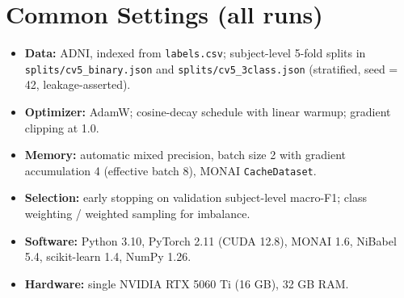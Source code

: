 \section*{Common Settings (all runs)}
\begin{itemize}
    \item \textbf{Data:} ADNI, indexed from \texttt{labels.csv}; subject-level 5-fold splits in \texttt{splits/cv5\_binary.json} and \texttt{splits/cv5\_3class.json} (stratified, seed = 42, leakage-asserted).
    \item \textbf{Optimizer:} AdamW; cosine-decay schedule with linear warmup; gradient clipping at 1.0.
    \item \textbf{Memory:} automatic mixed precision, batch size 2 with gradient accumulation 4 (effective batch 8), MONAI \texttt{CacheDataset}.
    \item \textbf{Selection:} early stopping on validation subject-level macro-F1; class weighting / weighted sampling for imbalance.
    \item \textbf{Software:} Python 3.10, PyTorch 2.11 (CUDA 12.8), MONAI 1.6, NiBabel 5.4, scikit-learn 1.4, NumPy 1.26.
    \item \textbf{Hardware:} single NVIDIA RTX 5060 Ti (16 GB), 32 GB RAM.
\end{itemize}

